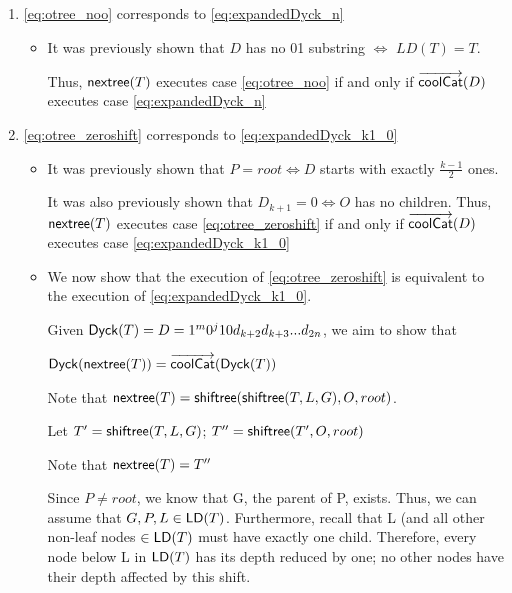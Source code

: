 \begin{enumerate}
    \item \ref{eq:otree_noo} corresponds to \ref{eq:expandedDyck_n}

	\begin{itemize}
	    \item It was previously shown that $D$ has no 01 substring $\iff$ $LD(T)=T$.  

		Thus, $\mathsf{nextree}{(T)}$ executes case \ref{eq:otree_noo} if and only if $\overrightarrow{\mathsf{coolCat}}{(D)}$ executes case  \ref{eq:expandedDyck_n}
	\end{itemize}
    \item \ref{eq:otree_zeroshift} corresponds to \ref{eq:expandedDyck_k1_0}

	\begin{itemize}
	    \item It was previously shown that $P=root \iff D$ starts with exactly $\frac{k-1}{2}$ ones.  

		It was also previously shown that $D_{k+1}=0 \iff O$ has no children.  
		Thus, $\mathsf{nextree}{(T)}$ executes case \ref{eq:otree_zeroshift} 
		if and only if $\overrightarrow{\mathsf{coolCat}}{(D)}$ executes case   \ref{eq:expandedDyck_k1_0}

	    \item We now show that the execution of \ref{eq:otree_zeroshift} is equivalent to the execution of    \ref{eq:expandedDyck_k1_0}.

		Given $\mathsf{Dyck}{(T)}=D=1^m0^{j}10d_{k+2}d_{k+3}...d_{2n}$, we aim to show that 

		$\mathsf{Dyck}{(\mathsf{nextree}{(T)})}=\overrightarrow{\mathsf{coolCat}}{(\mathsf{Dyck}{(T)})}$
\bigskip
\bigskip

		Note that $\mathsf{nextree}{(T)}=\mathsf{shiftree(} \mathsf{shiftree(} T, L, G \mathsf{)}, O, root \mathsf{)}$. 




		Let $T'=\mathsf{shiftree(} T, L, G \mathsf{)}$; $T''=\mathsf{shiftree(} T', O, root \mathsf{)}$

		Note that $\mathsf{nextree}{(T)}=T''$

		Since $P \ne root$, we know that G, the parent of P, exists. 
		Thus, we can assume that $G,P,L \in \mathsf{LD}{(T)}$.  Furthermore, recall that L (and all other non-leaf nodes $\in \mathsf{LD}{(T)}$ must have exactly one child.  Therefore, every node below L in $\mathsf{LD}{(T)}$ has its depth reduced by one; no other nodes have their depth affected by this shift.




\end{itemize}
\end{enumerate}
